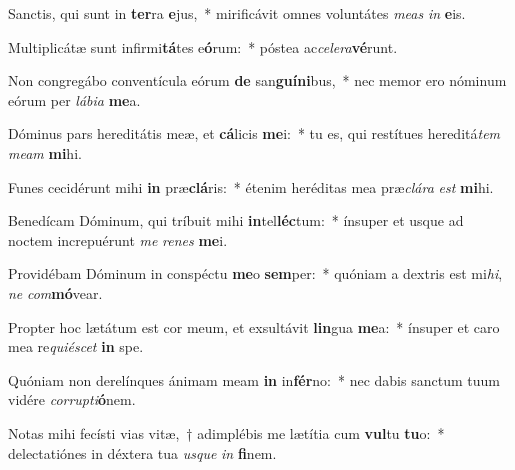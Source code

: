 \item Sanctis, qui sunt in \textbf{ter}ra \textbf{e}jus,~* mirificávit omnes voluntátes \textit{me}\textit{as} \textit{in} \textbf{e}is.
\item Multiplicátæ sunt infirmi\textbf{tá}tes e\textbf{ó}rum:~* póstea ac\textit{ce}\textit{le}\textit{ra}\textbf{vé}runt.
\item Non congregábo conventícula eórum \textbf{de} san\textbf{guí}\textbf{ni}bus,~* nec memor ero nóminum eórum per \textit{lá}\textit{bi}\textit{a} \textbf{me}a.
\item Dóminus pars hereditátis meæ, et \textbf{cá}licis \textbf{me}i:~* tu es, qui restítues hereditá\textit{tem} \textit{me}\textit{am} \textbf{mi}hi.
\item Funes cecidérunt mihi \textbf{in} præ\textbf{clá}ris:~* étenim heréditas mea præ\textit{clá}\textit{ra} \textit{est} \textbf{mi}hi.
\item Benedícam Dóminum, qui tríbuit mihi \textbf{in}tel\textbf{léc}tum:~* ínsuper et usque ad noctem increpuérunt \textit{me} \textit{re}\textit{nes} \textbf{me}i.
\item Providébam Dóminum in conspéctu \textbf{me}o \textbf{sem}per:~* quóniam a dextris est mi\textit{hi}, \textit{ne} \textit{com}\textbf{mó}vear.
\item Propter hoc lætátum est cor meum, et exsultávit \textbf{lin}gua \textbf{me}a:~* ínsuper et caro mea re\textit{qui}\textit{é}\textit{scet} \textbf{in} spe.
\item Quóniam non derelínques ánimam meam \textbf{in} in\textbf{fér}no:~* nec dabis sanctum tuum vidére \textit{cor}\textit{rup}\textit{ti}\textbf{ó}nem.
\item Notas mihi fecísti vias vitæ,~† adimplébis me lætítia cum \textbf{vul}tu \textbf{tu}o:~* delectatiónes in déxtera tua \textit{us}\textit{que} \textit{in} \textbf{fi}nem.
